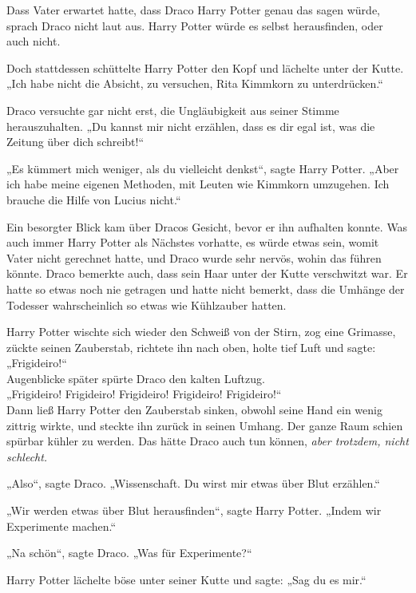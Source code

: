 {Dass Vater erwartet hatte, dass Draco Harry Potter genau das sagen würde, sprach Draco nicht laut aus. Harry Potter würde es selbst herausfinden, oder auch nicht.

Doch stattdessen schüttelte Harry Potter den Kopf und lächelte unter der Kutte.\\ „Ich habe nicht die Absicht, zu versuchen, Rita Kimmkorn zu unterdrücken.“

Draco versuchte gar nicht erst, die Ungläubigkeit aus seiner Stimme herauszuhalten. „Du kannst mir nicht erzählen, dass es dir egal ist, was die Zeitung über dich schreibt!“

„Es kümmert mich weniger, als du vielleicht denkst“, sagte Harry Potter. „Aber ich habe meine eigenen Methoden, mit Leuten wie Kimmkorn umzugehen. Ich brauche die Hilfe von Lucius nicht.“

Ein besorgter Blick kam über Dracos Gesicht, bevor er ihn aufhalten konnte. Was auch immer Harry Potter als Nächstes vorhatte, es würde etwas sein, womit Vater nicht gerechnet hatte, und Draco wurde sehr nervös, wohin das führen könnte. Draco bemerkte auch, dass sein Haar unter der Kutte verschwitzt war. Er hatte so etwas noch nie getragen und hatte nicht bemerkt, dass die Umhänge der Todesser wahrscheinlich so etwas wie Kühlzauber hatten.

Harry Potter wischte sich wieder den Schweiß von der Stirn, zog eine Grimasse, zückte seinen Zauberstab, richtete ihn nach oben, holte tief Luft und sagte: „Frigideiro!“\\ Augenblicke später spürte Draco den kalten Luftzug.\\ „Frigideiro! Frigideiro! Frigideiro! Frigideiro! Frigideiro!“\\ Dann ließ Harry Potter den Zauberstab sinken, obwohl seine Hand ein wenig zittrig wirkte, und steckte ihn zurück in seinen Umhang. Der ganze Raum schien spürbar kühler zu werden. Das hätte Draco auch tun können, \emph{aber trotzdem, nicht schlecht.}

„Also“, sagte Draco. „Wissenschaft. Du wirst mir etwas über Blut erzählen.“

„Wir werden etwas über Blut herausfinden“, sagte Harry Potter. „Indem wir Experimente machen.“

„Na schön“, sagte Draco. „Was für Experimente?“

Harry Potter lächelte böse unter seiner Kutte und sagte: „Sag du es mir.“

}
